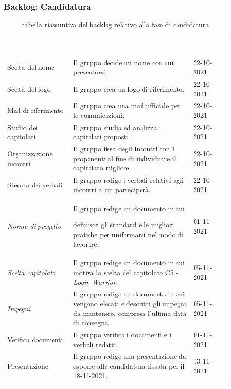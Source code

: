 \subsubsection{Backlog: Candidatura}
{\renewcommand{\arraystretch}{1.5}
\begin{longtable}{p{0.27\linewidth}p{0.49\linewidth}p{0.15\linewidth}}
	\rowcolor[RGB]{33, 73, 50}
	\textcolor{white}{\textbf{Titolo attività}} & \textcolor{white}{\textbf{Descrizione}} & \textcolor{white}{\textbf{Data inizio}}\\
    \rowcolor[RGB]{216, 235, 171}
    Scelta del nome & Il gruppo decide un nome con cui presentarsi. & 22-10-2021\\
    
    \rowcolor[RGB]{233, 245, 206}
    Scelta del logo & Il gruppo crea un logo di riferimento. & 22-10-2021\\
    
    \rowcolor[RGB]{216, 235, 171}
    Mail di riferimento & Il gruppo crea una mail ufficiale per le comunicazioni. & 22-10-2021\\
    
    \rowcolor[RGB]{233, 245, 206}
    Studio dei capitolati & Il gruppo studia ed analizza i capitolati proposti. & 22-10-2021\\
	
    \rowcolor[RGB]{216, 235, 171}
    Organizzazione incontri & Il gruppo fissa degli incontri con i proponenti al fine di individuare il capitolato migliore. & 22-10-2021\\
    
    \rowcolor[RGB]{233, 245, 206}
    Stesura dei verbali & Il gruppo redige i verbali relativi agli incontri a cui parteciperà. & 22-10-2021\\
    
    \rowcolor[RGB]{216, 235, 171}
    \textit{Norme di progetto} & Il gruppo redige un documento in cui \par definisce gli standard e le migliori pratiche per uniformarsi nel modo di lavorare. & 01-11-2021\\

    \rowcolor[RGB]{233, 245, 206}
    \textit{Scelta capitolato} & Il gruppo redige un documento in cui motiva la scelta del 
    capitolato C5 - \textit{Login Warrior}. & 05-11-2021\\

    \rowcolor[RGB]{216, 235, 171}
    \textit{Impegni} & Il gruppo redige un documento in cui vengono elecati e descritti gli impegni da mantenere, compresa l'ultima data di consegna. & 05-11-2021\\

    \rowcolor[RGB]{233, 245, 206}
    Verifica documenti & Il gruppo verifica i documenti e i verbali redatti. & 01-11-2021\\

    \rowcolor[RGB]{216, 235, 171}
    Presentazione & Il gruppo redige una presentazione da esporre alla candidatura fissata per il 18-11-2021. & 13-11-2021\\

    \caption{tabella riassuntiva del backlog relativo alla fase di candidatura}
\end{longtable}	
}


